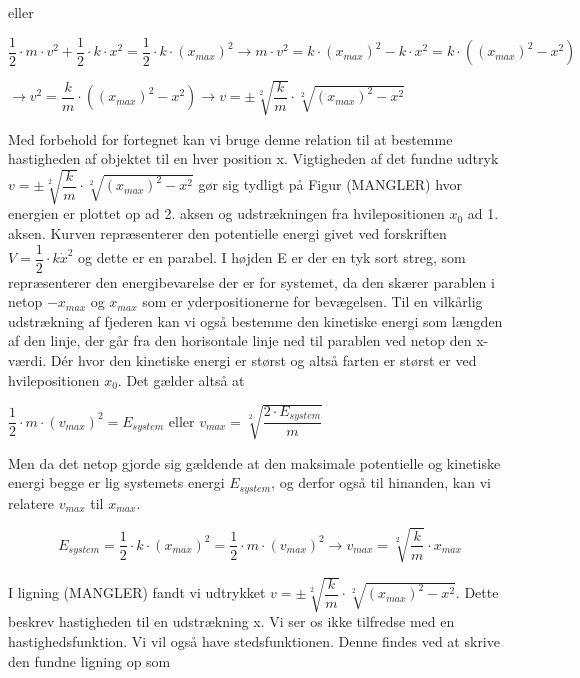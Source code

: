 eller 

\bigskip
\begin{center}
$\dfrac{1}{2} \cdot m \cdot v^2 + \dfrac{1}{2} \cdot k \cdot x^2 = \dfrac{1}{2} \cdot k \cdot (x_{max})^2 \rightarrow m \cdot v^2 = k \cdot (x_{max})^2 - k \cdot x^2 = k \cdot ((x_{max})^2 - x^2)$

$\rightarrow v^2 = \dfrac{k}{m} \cdot ((x_{max})^2 - x^2) \rightarrow v = \pm \sqrt[2]{\dfrac{k}{m}} \cdot \sqrt[2]{(x_{max})^2-x^2}$
\end{center}
\bigskip

Med forbehold for fortegnet kan vi bruge denne relation til at bestemme hastigheden af objektet til en hver position x. Vigtigheden af det fundne udtryk $v = \pm \sqrt[2]{\dfrac{k}{m}} \cdot \sqrt[2]{(x_{max})^2-x^2}$ gør sig tydligt på Figur (MANGLER) hvor energien er plottet op ad 2. aksen og udstrækningen fra hvilepositionen $x_0$ ad 1. aksen. Kurven repræsenterer den potentielle energi givet ved forskriften $V=\dfrac{1}{2} \cdot k \dot x^2$ og dette er en parabel. I højden E er der en tyk sort streg, som repræsenterer den energibevarelse der er for systemet, da den skærer parablen i netop $-x_{max}$ og $x_{max}$ som er yderpositionerne for bevægelsen. Til en vilkårlig udstrækning af fjederen kan vi også bestemme den kinetiske energi som længden af den linje, der går fra den horisontale linje ned til parablen ved netop den x-værdi. Dér hvor den kinetiske energi er størst og altså farten er størst er ved hvilepositionen $x_0$. Det gælder altså at

\bigskip
\begin{center}
$\dfrac{1}{2} \cdot m \cdot (v_{max})^2 = E_{system}$ eller $v_{max} = \sqrt[2]{\dfrac{2 \cdot E_{system}}{m}}$
\end{center}
\bigskip

Men da det netop gjorde sig gældende at den maksimale potentielle og kinetiske energi begge er lig systemets energi $E_{system}$, og derfor også til hinanden, kan vi relatere $v_{max}$ til $x_{max}$.

\begin{center}
\begin{equation}
E_{system} = \dfrac{1}{2} \cdot k \cdot (x_{max})^2 = \dfrac{1}{2} \cdot m \cdot (v_{max})^2 \rightarrow v_{max} = \sqrt[2]{\dfrac{k}{m}} \cdot x_{max}
\end{equation}
\end{center}

I ligning (MANGLER) fandt vi udtrykket $v = \pm \sqrt[2]{\dfrac{k}{m}} \cdot \sqrt[2]{(x_{max})^2-x^2}$. Dette beskrev hastigheden til en udstrækning x. Vi ser os ikke tilfredse med en hastighedsfunktion. Vi vil også have stedsfunktionen. Denne findes ved at skrive den fundne ligning op som 

